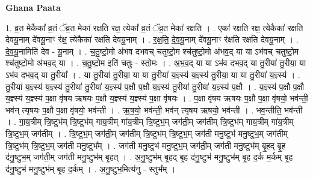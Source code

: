 \documentclass[17pt]{extarticle}
\begin{document}
\textbf{Ghana Paata } \newline

1. व्र॒त मेकैका᳚ व्र॒तं ॅव्र॒त मेका॑ रक्षति रक्ष॒ त्येका᳚ व्र॒तं ॅव्र॒त मेका॑ रक्षति । . एका॑ रक्षति रक्ष॒ त्येकैका॑ रक्षति देवयू॒नाम् दे॑वयू॒नाꣳ र॑क्ष॒ त्येकैका॑ रक्षति देवयू॒नाम् । . र॒क्ष॒ति॒ दे॒व॒यू॒नाम् दे॑वयू॒नाꣳ र॑क्षति रक्षति देवयू॒नाम् । . दे॒व॒यू॒नामिति॑ देव - यू॒नाम् । . च॒तु॒ष्टो॒मो अ॑भव दभवच् चतुष्टो॒म श्च॑तुष्टो॒मो अ॑भव॒द् या या ऽभ॑वच् चतुष्टो॒म श्च॑तुष्टो॒मो अ॑भव॒द् या । . च॒तु॒ष्टो॒म इति॑ चतुः - स्तो॒मः । . अ॒भ॒व॒द् या या ऽभ॑व दभव॒द् या तु॒रीया॑ तु॒रीया॒ या ऽभ॑व दभव॒द् या तु॒रीया᳚ । . या तु॒रीया॑ तु॒रीया॒ या या तु॒रीया॑ य॒ज्ञ्स्य॑ य॒ज्ञ्स्य॑ तु॒रीया॒ या या तु॒रीया॑ य॒ज्ञ्स्य॑ । . तु॒रीया॑ य॒ज्ञ्स्य॑ य॒ज्ञ्स्य॑ तु॒रीया॑ तु॒रीया॑ य॒ज्ञ्स्य॑ प॒क्षौ प॒क्षौ य॒ज्ञ्स्य॑ तु॒रीया॑ तु॒रीया॑ य॒ज्ञ्स्य॑ प॒क्षौ । . य॒ज्ञ्स्य॑ प॒क्षौ प॒क्षौ य॒ज्ञ्स्य॑ य॒ज्ञ्स्य॑ प॒क्षा वृ॑षय ऋषयः प॒क्षौ य॒ज्ञ्स्य॑ य॒ज्ञ्स्य॑ प॒क्षा वृ॑षयः । . प॒क्षा वृ॑षय ऋषयः प॒क्षौ प॒क्षा वृ॑षयो॒ भव॑न्ती॒ भव॑न् त्यृषयः प॒क्षौ प॒क्षा वृ॑षयो॒ भव॑न्ती । . ऋ॒ष॒यो॒ भव॑न्ती॒ भव॑न् त्यृषय ऋषयो॒ भव॑न्ती । . भव॒न्तीति॒ भव॑न्ती । . गा॒य॒त्रीम् त्रि॒ष्टुभ॑म् त्रि॒ष्टुभ॑म् गाय॒त्रीम् गा॑य॒त्रीम् त्रि॒ष्टुभ॒म् जग॑ती॒म् जग॑तीम् त्रि॒ष्टुभ॑म् गाय॒त्रीम् गा॑य॒त्रीम् त्रि॒ष्टुभ॒म् जग॑तीम् । . त्रि॒ष्टुभ॒म् जग॑ती॒म् जग॑तीम् त्रि॒ष्टुभ॑म् त्रि॒ष्टुभ॒म् जग॑ती मनु॒ष्टुभ॑ मनु॒ष्टुभ॒म् जग॑तीम् त्रि॒ष्टुभ॑म् त्रि॒ष्टुभ॒म् जग॑ती मनु॒ष्टुभ᳚म् । . जग॑ती मनु॒ष्टुभ॑ मनु॒ष्टुभ॒म् जग॑ती॒म् जग॑ती मनु॒ष्टुभ॑म् बृ॒हद् बृ॒ह द॑नु॒ष्टुभ॒म् जग॑ती॒म् जग॑ती मनु॒ष्टुभ॑म् बृ॒हत् । . अ॒नु॒ष्टुभ॑म् बृ॒हद् बृ॒ह द॑नु॒ष्टुभ॑ मनु॒ष्टुभ॑म् बृ॒ह द॒र्क म॒र्कम् बृ॒ह द॑नु॒ष्टुभ॑ मनु॒ष्टुभ॑म् बृ॒ह द॒र्कम् । . अ॒नु॒ष्टुभ॒मित्य॑नु - स्तुभ᳚म् । \newline
\end{document}
